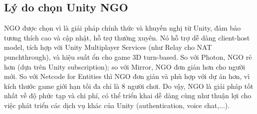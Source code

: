 \subsection{Lý do chọn Unity NGO}
NGO được chọn vì là giải pháp chính thức và khuyến nghị từ Unity, đảm bảo tương thích cao và cập nhật, hỗ trợ thường xuyên. Nó hỗ trợ dễ dàng client-host model, tích hợp với Unity Multiplayer Services (như Relay cho NAT punchthrough), và hiệu suất ổn cho game 3D turn-based. So với Photon, NGO rẻ hơn (dựa trên Unity subscription); so với Mirror, NGO đơn giản hơn cho người mới. So với Netcode for Entities thì NGO đơn giản và phù hợp với dự án hơn, vì kích thước game giới hạn tối đa chỉ là 8 người chơi. Do vậy, NGO là giải pháp tốt nhất về độ phức tạp và chi phí, có thể triển khai dễ dàng cùng như thuận lợi cho việc phát triển các dịch vụ khác của Unity (authentication, voice chat,...).